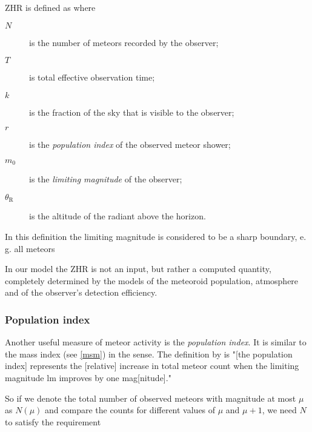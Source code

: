             ZHR is defined as
            where
            \begin{description}
                \item[$N$]
                    is the number of meteors recorded by the observer;
                \item[$T$]
                    is total effective observation time;
                \item[$k$]
                    is the fraction of the sky that is visible to the observer;
                \item[$r$]
                    is the \emph{population index} of the observed meteor shower;
                \item[$m_0$]
                    is the \emph{limiting magnitude} of the observer;
                \item[$\theta_\mathrm{R}$]
                    is the altitude of the radiant above the horizon.
            \end{description}
            In this definition the limiting magnitude is considered to be a sharp boundary, e. g. all meteors

            In our model the ZHR is not an input, but rather a computed quantity, completely determined by the
            models of the meteoroid population, atmosphere and of the observer's detection efficiency.

        \subsubsection{Population index} \label{mspr}
            Another useful measure of meteor activity is the \emph{population index}.
            It is similar to the mass index (see \cref{msm}) in the sense.
            The definition by \citet{molau2015} is "[the population index] represents the [relative] increase
            in total meteor count when the limiting magnitude $\mathrm{lm}$ improves by one mag[nitude]."

            So if we denote the total number of observed meteors with magnitude at most $\mu$ as $N(\mu)$
            and compare the counts for different values of $\mu$ and $\mu + 1$, we need $N$ to satisfy the requirement

